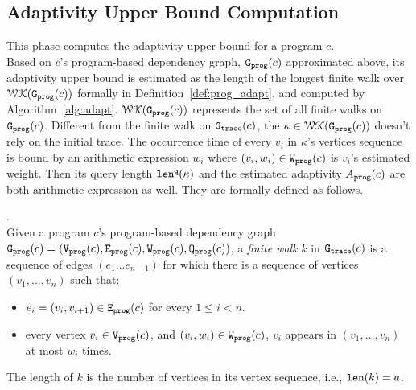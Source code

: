 \subsection{Adaptivity Upper Bound Computation}
\label{sec:alg_adaptcompute}
This phase computes the adaptivity upper bound for a program $c$.
\\
Based on
$c$'s program-based dependency graph, $\mathtt{{G_{prog}}}({c})$ approximated above,
%
its adaptivity upper bound 
%
is estimated as
the length of the longest finite walk over $\mathcal{WK}(\mathtt{{G_{prog}}}({c}))$ formally in Definition~\ref{def:prog_adapt}, 
and computed 
by Algorithm~\ref{alg:adapt}.
%
$\mathcal{WK}(\mathtt{{G_{prog}}}(c))$ represents the set of all finite walks on
 $\mathtt{{G_{prog}}}({c})$.
Different from the finite walk on $\mathtt{{G_{trace}}}(c)$, the $\kappa \in \mathcal{WK}(\mathtt{{G_{prog}}}(c))$ doesn't rely on the initial trace.
The occurrence time of every $v_i$ in $\kappa$'s vertices sequence is bound by 
an arithmetic expression $w_i$ where $(v_i, w_i) \in \mathtt{{W_{prog}}}(c)$ is $v_i$'s estimated weight.
Then its query length $\mathtt{len}^{\tt q}(\kappa)$ and the estimated adaptivity $A_{\mathtt{prog}}(c)$ are both arithmetic expression as well.
%
They are formally defined as follows.
\begin{defn}.
  \label{def:prog_finitewalk}
  \\
  Given a program $c$'s program-based dependency graph 
  $\mathtt{{G_{prog}}}({c}) = (\mathtt{{V_{prog}}}(c), \mathtt{{E_{prog}}}(c), \mathtt{{W_{prog}}}(c), \mathtt{{Q_{prog}}}(c))$, 
  a \emph{finite walk} $k$ in $\mathtt{{G_{trace}}}({c})$ is
  a sequence of edges $(e_1 \ldots e_{n - 1})$ 
  for which there is a sequence of vertices 
  $(v_1, \ldots, v_{n})$ such that:
  \begin{itemize}
      \item $e_i = (v_{i},v_{i + 1}) \in \mathtt{{E_{prog}}}(c)$ for every $1 \leq i < n$.
      \item every vertex $v_i \in \mathtt{{V_{prog}}}(c)$,
      and $(v_i, w_i) \in \mathtt{{W_{prog}}}(c)$, 
       $v_i$ appears in $(v_1, \ldots, v_{n})$ at most 
    $w_i$
      times.  
  \end{itemize}
  The length of $k$ is the number of vertices in its vertex sequence, i.e., $\mathtt{len}(k) = a$.
 \end{defn}

